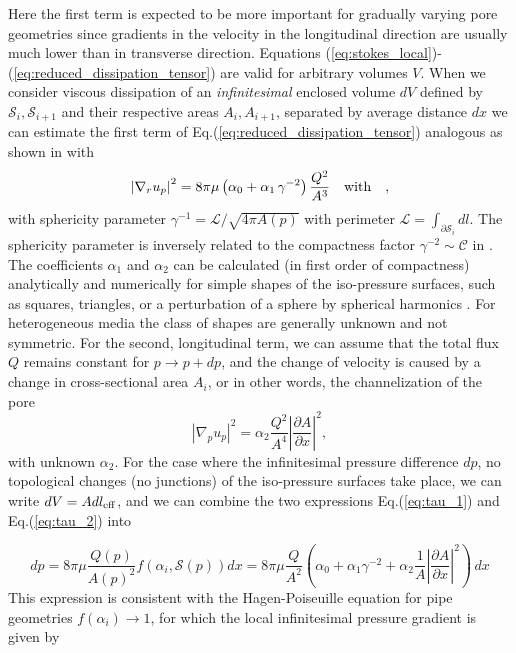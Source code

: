 \documentclass[draft]{agujournal2019}
\begin{document}
Here the first term is expected to be more important for gradually varying pore geometries since gradients in the velocity in the longitudinal direction are usually much lower than in transverse direction. Equations (\ref{eq:stokes_local})-(\ref{eq:reduced_dissipation_tensor}) are valid for arbitrary volumes $V$. When we consider viscous dissipation of an \textit{infinitesimal} enclosed volume $dV$ defined by $\mathcal{S}_i,\mathcal{S}_{i+1}$ and their respective areas $A_i, A_{i+1}$, separated by average distance $dx$ we can estimate the first term of Eq.(\ref{eq:reduced_dissipation_tensor}) analogous as shown in \cite{mortensen_reexamination_2005} with
\begin{equation}
	\left|\nabla_r u_p\right|^2 =8\pi\mu \left(\alpha_0+\alpha_1\,\gamma^{-2}\right)\frac{ Q^2}{A^3}~~~ \rm{with}~~~ ,\label{eq:tau_1}
\end{equation}
with sphericity parameter $\gamma^{-1} = \mathcal{L}/\sqrt{ 4\pi A(p)}$ with perimeter $\mathcal{L} = \int_{\partial \mathcal{S}_i}dl$. The sphericity parameter is inversely related to the compactness factor $\gamma^{-2}\sim \mathcal{C}$ in \cite{mortensen_reexamination_2005}. The coefficients $\alpha_1$ and $\alpha_2$ can be calculated (in first order of compactness) analytically and numerically for simple shapes of the iso-pressure surfaces, such as squares, triangles, or a perturbation of a sphere by spherical harmonics . For heterogeneous media the class of shapes are generally unknown and not symmetric. 
For the second, longitudinal term, we can assume that the total flux $Q$ remains constant for $p\rightarrow p+dp$, and the change of velocity is caused by a change in cross-sectional area $A_i$, or in other words, the channelization of the pore 
\begin{equation}
	\left|\nabla_p u_p\right|^2 = \alpha_2  \frac{Q^2}{A^4}\left|\frac{\partial A}{\partial x }\right|^2,\label{eq:tau_2}
\end{equation}
with unknown $\alpha_2$. For the case where the infinitesimal pressure difference $dp$, no topological changes (no junctions) of the iso-pressure surfaces take place, we can write $dV = A dl_{\rm{eff}}$, and we can combine the two expressions Eq.(\ref{eq:tau_1}) and Eq.(\ref{eq:tau_2}) into

\begin{equation}
	dp = 8\pi \mu \frac{Q(p)}{A(p)^2} f\left(\alpha_i,\mathcal{S}(p) \right) dx= 8 \pi \mu\frac{Q}{A^2}\left(\alpha_0+\alpha_1\gamma^{-2} + \alpha_2 \frac{1}{A}\left|\frac{\partial A}{\partial x}\right|^2\right)\,dx\label{eq:infi_dp}
\end{equation}
This expression is consistent with the Hagen-Poiseuille equation for pipe geometries $f(\alpha_i)\rightarrow 1$, for which the local infinitesimal pressure gradient is given by 
\end{document}
